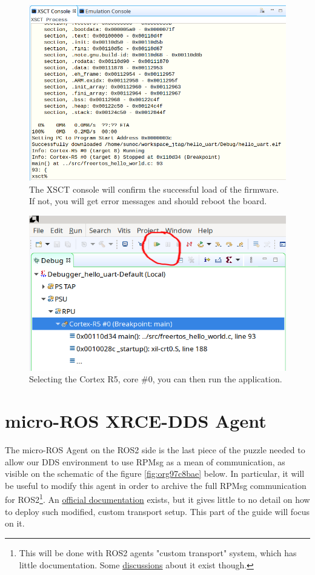 \documentclass[10pt]{article}
\begin{document}
\begin{figure}[htbp]
\centering
\includegraphics[width=.6\textwidth]{./img/jtag/console.png}
\caption{\label{fig:org22c941a}The XSCT console will confirm the successful load of the firmware. If not, you will get error messages and should reboot the board.}
\end{figure}

\begin{figure}[htbp]
\centering
\includegraphics[width=.6\textwidth]{./img/jtag/run.png}
\caption{\label{fig:orgc40f9b1}Selecting the Cortex R5, core \#0, you can then run the application.}
\end{figure}

\clearpage
\section{micro-ROS XRCE-DDS Agent}
\label{sec:org8eae8a4}
The micro-ROS Agent on the ROS2 side is the last piece of the puzzle needed to
allow our DDS environment to use RPMsg as a mean of communication, as visible
on the schematic of the figure \ref{fig:org97c8bae} below.
In particular, it will be useful to modify this agent in order to archive
the full RPMsg communication for ROS2\footnote{This will be done with ROS2 agents "custom transport"  system,
which has little documentation. Some \href{https://github.com/micro-ROS/micro\_ros\_setup/issues/383}{discussions} about it exist though.}.
An \href{https://micro.ros.org/docs/tutorials/advanced/create\_custom\_transports/}{official documentation} exists, but it gives little to no detail
on how to deploy such modified, custom transport setup.
This part of the guide will focus on it.
\end{document}
